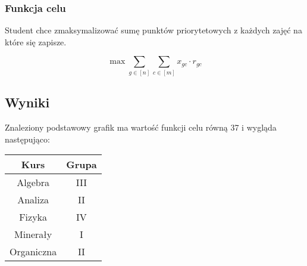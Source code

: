 \documentclass{article}
\theoremstyle{definition}
\theoremstyle{remark}
\theoremstyle{plain}
\theoremstyle{remark}
\theoremstyle{plain}
\begin{document}
\subsubsection{Funkcja celu}
Student chce zmaksymalizować sumę punktów priorytetowych z każdych zajęć na które się zapisze.

\[ \max {\sum_{g \in [n]}{\sum_{c \in [m]}{x_{gc}\cdot r_{gc}}}} \]

\subsection{Wyniki}
Znaleziony podstawowy grafik ma wartość funkcji celu równą 37 i wygląda następująco:
\begin{table}[H]
	\centering
	\begin{tabular}{|c|c|} \hline
		Kurs & Grupa \\\hline
        Algebra & III \\\hline
        Analiza & II \\\hline
        Fizyka & IV \\\hline
        Minerały & I \\\hline
        Organiczna & II \\\hline
	\end{tabular}
\end{table}
\end{document}
